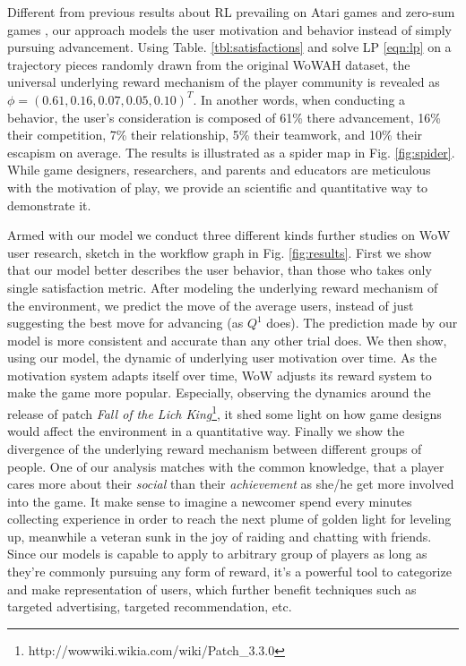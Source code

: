\documentclass{sigchi}
\begin{document}
Different from previous results about RL prevailing on Atari games \cite{mnih2015human} and zero-sum games \cite{silver2016mastering,heinrich2016deep}, our approach models the user motivation and behavior instead of simply pursuing advancement. 
Using Table. \ref{tbl:satisfactions} and solve LP \eqref{eqn:lp} on a trajectory pieces randomly drawn from the original WoWAH dataset, the universal underlying reward mechanism of the player community is revealed as $\phi=(0.61, 0.16, 0.07, 0.05, 0.10)^T$. 
In another words, when conducting a behavior, the user's consideration is composed of 61\% there advancement, 16\% their competition, 7\% their relationship, 5\% their teamwork, and 10\% their escapism on average. 
The results is illustrated as a spider map in Fig. \ref{fig:spider}.
While game designers, researchers, and parents and educators are meticulous with the motivation of play, we provide an scientific and quantitative way to demonstrate it.

Armed with our model we conduct three different kinds further studies on WoW user research, sketch in the workflow graph in Fig. \ref{fig:results}.
First we show that our model better describes the user behavior, than those who takes only single satisfaction metric.
After modeling the underlying reward mechanism of the environment, we predict the move of the average users, instead of just suggesting the best move for advancing (as $Q^1$ does).
The prediction made by our model is more consistent and accurate than any other trial does.
We then show, using our model, the dynamic of underlying user motivation over time. 
As the motivation system adapts itself over time, WoW adjusts its reward system to make the game more popular.
Especially, observing the dynamics around the release of patch \textit{Fall of the Lich King}\footnote{http://wowwiki.wikia.com/wiki/Patch\_3.3.0}, it shed some light on how game designs would affect the environment in a quantitative way.
Finally we show the divergence of the underlying reward mechanism between different groups of people. 
One of our analysis matches with the common knowledge, that a player cares more about their \textit{social} than their \textit{achievement} as she/he get more involved into the game.
It make sense to imagine a newcomer spend every minutes collecting experience in order to reach the next plume of golden light for leveling up, meanwhile a veteran sunk in the joy of raiding and chatting with friends.
Since our models is capable to apply to arbitrary group of players as long as they're commonly pursuing any form of reward, it's a powerful tool to categorize and make representation of users, which further benefit techniques such as targeted advertising, targeted recommendation, etc.
\end{document}
